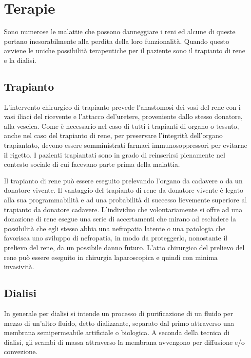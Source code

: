 \section{Terapie}
Sono numerose le malattie che possono danneggiare i reni ed alcune di queste portano inesorabilmente alla perdita della loro funzionalità. Quando questo avviene le uniche possibilità terapeutiche per il paziente sono il trapianto di rene e la dialisi.

\subsection{Trapianto}
L'intervento chirurgico di trapianto prevede l'anastomosi dei vasi del rene con i vasi iliaci del ricevente e l'attacco del'uretere, proveniente dallo stesso donatore, alla vescica. Come è necessario nel caso di tutti i trapianti di organo o tessuto, anche nel caso del trapianto di rene, per preservare l'integrità dell'organo trapiantato, devono essere somministrati farmaci immunosoppressori per evitarne il rigetto. I pazienti trapiantati sono in grado di reinserirsi pienamente nel contesto sociale di cui facevano parte prima della malattia.

Il trapianto di rene può essere eseguito prelevando l'organo da cadavere o da un donatore vivente. Il vantaggio del trapianto di rene da donatore vivente è legato alla sua programmabilità e ad una probabilità di successo lievemente superiore al trapianto da donatore cadavere.  L'individuo che volontariamente si offre ad una donazione di rene esegue una serie di accertamenti che mirano ad escludere la possibilità che egli stesso abbia una nefropatia latente o una patologia che favorisca uno sviluppo di nefropatia, in modo da proteggerlo, nonostante il prelievo del rene, da un possibile danno futuro. L'atto chirurgico del prelievo del rene può essere eseguito in chirurgia laparoscopica e quindi con minima invasività.



\subsection{Dialisi}
In generale per dialisi si intende un processo di purificazione di un fluido per mezzo di un'altro fluido, detto dializzante, separato dal primo attraverso una membrana semipermeabile artificiale o biologica. A seconda della tecnica di dialisi, gli scambi di massa attraverso la membrana avvengono per diffusione e/o convezione.

